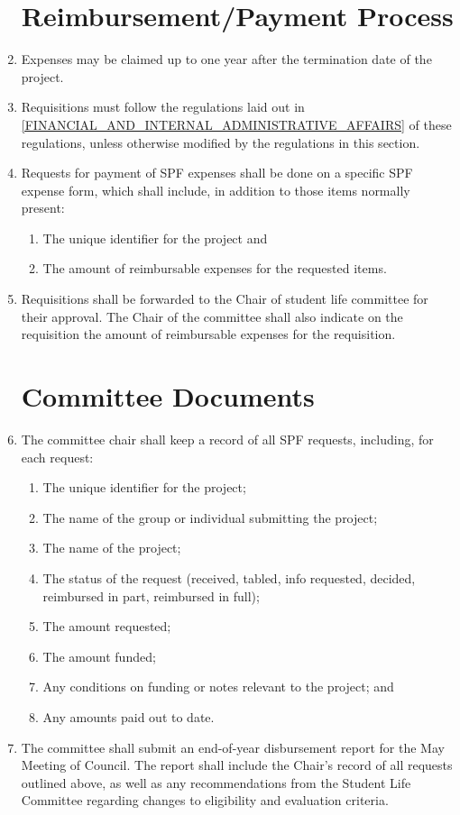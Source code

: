 \documentclass[oneside]{book}
\begin{document}
\begin{enumerate}
\chapter{\label{Reimbursement_Payment_Process}Reimbursement/Payment Process}

\item Expenses may be claimed up to one year after the termination date of the project. 
\item Requisitions must follow the regulations laid out in \autoref{FINANCIAL_AND_INTERNAL_ADMINISTRATIVE_AFFAIRS} of these regulations, unless otherwise modified by the regulations in this section.
\item Requests for payment of SPF expenses shall be done on a specific SPF expense form, which shall include, in addition to those items normally present:
	\begin{enumerate}
	\item The unique identifier for the project and
	\item The amount of reimbursable expenses for the requested items.
	\end{enumerate}
\item Requisitions shall be forwarded to the Chair of student life committee for their approval. The Chair of the committee shall also indicate on the requisition the amount of reimbursable expenses for the requisition. 

\chapter{\label{SPF_Committee_Documents}Committee Documents}

\item The committee chair shall keep a record of all SPF requests, including, for each request:
	\begin{enumerate}
	\item The unique identifier for the project;
	\item The name of the group or individual submitting the project;
	\item The name of the project;
	\item The status of the request (received, tabled, info requested, decided, reimbursed in part, reimbursed in full);
	\item The amount requested;
	\item The amount funded;
	\item Any conditions on funding or notes relevant to the project; and
	\item Any amounts paid out to date.
	\end{enumerate}
\item The committee shall submit an end-of-year disbursement report for the May Meeting of Council. The report shall include the Chair’s record of all requests outlined above, as well as any recommendations from the Student Life Committee regarding changes to eligibility and evaluation criteria. 


\end{enumerate}
\end{document}
